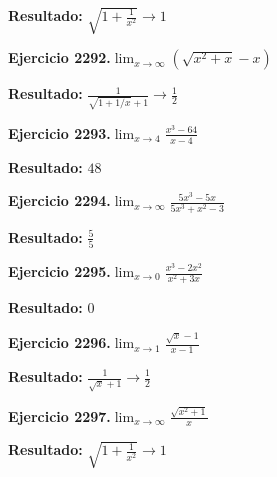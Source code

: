 \documentclass[10pt,a4paper]{article}
\begin{document}
\begin{solbox}
\textbf{Resultado:} \(\displaystyle \sqrt{1+\frac{1}{x^2}} \to 1\)
\end{solbox}

\begin{ejbox}
\textbf{Ejercicio 2292.}\quad $\lim_{x\to \infty} (\sqrt{x^2+x} - x)$
\end{ejbox}

\begin{solbox}
\textbf{Resultado:} \(\displaystyle \frac{1}{\sqrt{1+1/x}+1} \to \frac{1}{2}\)
\end{solbox}

\begin{ejbox}
\textbf{Ejercicio 2293.}\quad $\lim_{x\to 4} \frac{x^3-64}{x-4}$
\end{ejbox}

\begin{solbox}
\textbf{Resultado:} \(\displaystyle 48\)
\end{solbox}

\newpage
\begin{ejbox}
\textbf{Ejercicio 2294.}\quad $\lim_{x\to \infty} \frac{5x^3 - 5x}{5x^3 + x^2 - 3}$
\end{ejbox}

\begin{solbox}
\textbf{Resultado:} \(\displaystyle \frac{5}{5}\)
\end{solbox}

\begin{ejbox}
\textbf{Ejercicio 2295.}\quad $\lim_{x\to 0} \frac{x^3-2x^2}{x^2+3x}$
\end{ejbox}

\begin{solbox}
\textbf{Resultado:} \(\displaystyle 0\)
\end{solbox}

\begin{ejbox}
\textbf{Ejercicio 2296.}\quad $\lim_{x\to 1} \frac{\sqrt{x}-1}{x-1}$
\end{ejbox}

\begin{solbox}
\textbf{Resultado:} \(\displaystyle \frac{1}{\sqrt{x}+1} \to \frac{1}{2}\)
\end{solbox}

\newpage
\begin{ejbox}
\textbf{Ejercicio 2297.}\quad $\lim_{x\to \infty} \frac{\sqrt{x^2+1}}{x}$
\end{ejbox}

\begin{solbox}
\textbf{Resultado:} \(\displaystyle \sqrt{1+\frac{1}{x^2}} \to 1\)
\end{solbox}
\end{document}
